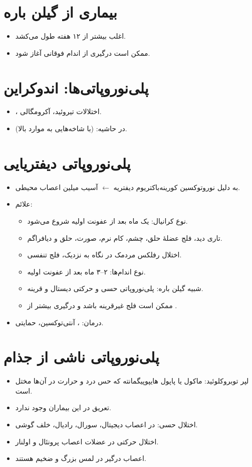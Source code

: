 \documentclass[a4paper,12pt]{extbook}
\begin{document}
\section*{ بیماری  از گیلن باره}
\begin{itemize}
\item اغلب  بیشتر از ۱۲ هفته طول می‌کشد.
\item ممکن است درگیری از اندام فوقانی آغاز شود.
\end{itemize}
\section*{پلی‌نوروپاتی‌ها: اندوکراین}
\begin{itemize}
\item {}، اختلالات تیروئید، آکرومگالی.
\item در حاشیه:  (با شاخه‌هایی به موارد بالا).
\end{itemize}
\section*{پلی‌نوروپاتی دیفتریایی}
\begin{itemize}
\item به دلیل نوروتوکسین کورینه‌باکتریوم دیفتریه $\longleftarrow$ آسیب میلین اعصاب محیطی.
\item علائم:
\begin{itemize}
\item نوع کرانیال: یک ماه بعد از عفونت اولیه شروع می‌شود.
\item تاری دید، فلج عضلهٔ حلق، چشم، کام نرم، صورت، حلق و دیافراگم.
\item اختلال رفلکس مردمک در نگاه به نزدیک، فلج تنفسی.
\item نوع اندام‌ها: ۲–۳ ماه بعد از عفونت اولیه.
\item شبیه گیلن باره: پلی‌نوروپاتی حسی و حرکتی دیستال و قرینه.
\item ممکن است فلج غیرقرینه باشد و درگیری  بیشتر از .
\end{itemize}
\item درمان: ، آنتی‌توکسین، حمایتی.
\end{itemize}
\section*{پلی‌نوروپاتی ناشی از جذام}
\begin{itemize}
\item لپر توبروکلوئید: ماکول یا پاپول هایپوپیگمانته که حس درد و حرارت در آن‌ها مختل است.
\item تعریق در این بیماران وجود ندارد.
\item اختلال حسی: در اعصاب دیجیتال، سورال، رادیال، خلف گوشی.
\item اختلال حرکتی در عضلات اعصاب پرونئال و اولنار.
\item اعصاب درگیر در لمس بزرگ و ضخیم هستند.
\end{itemize}
\end{document}

